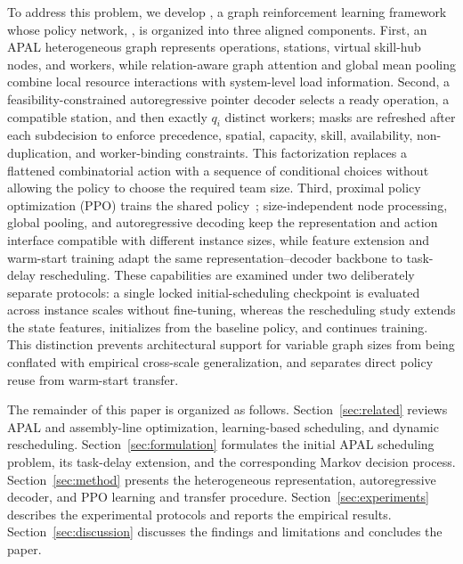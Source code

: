 To address this problem, we develop \method{}, a graph reinforcement learning framework whose policy network, \network{}, is organized into three aligned components. First, an APAL heterogeneous graph represents operations, stations, virtual skill-hub nodes, and workers, while relation-aware graph attention and global mean pooling combine local resource interactions with system-level load information. Second, a feasibility-constrained autoregressive pointer decoder selects a ready operation, a compatible station, and then exactly $q_i$ distinct workers; masks are refreshed after each subdecision to enforce precedence, spatial, capacity, skill, availability, non-duplication, and worker-binding constraints. This factorization replaces a flattened combinatorial action with a sequence of conditional choices without allowing the policy to choose the required team size. Third, proximal policy optimization (PPO) trains the shared policy~\cite{schulman2017}; size-independent node processing, global pooling, and autoregressive decoding keep the representation and action interface compatible with different instance sizes, while feature extension and warm-start training adapt the same representation--decoder backbone to task-delay rescheduling. These capabilities are examined under two deliberately separate protocols: a single locked initial-scheduling checkpoint is evaluated across instance scales without fine-tuning, whereas the rescheduling study extends the state features, initializes from the baseline policy, and continues training. This distinction prevents architectural support for variable graph sizes from being conflated with empirical cross-scale generalization, and separates direct policy reuse from warm-start transfer.

The remainder of this paper is organized as follows. Section~\ref{sec:related} reviews APAL and assembly-line optimization, learning-based scheduling, and dynamic rescheduling. Section~\ref{sec:formulation} formulates the initial APAL scheduling problem, its task-delay extension, and the corresponding Markov decision process. Section~\ref{sec:method} presents the heterogeneous representation, autoregressive decoder, and PPO learning and transfer procedure. Section~\ref{sec:experiments} describes the experimental protocols and reports the empirical results. Section~\ref{sec:discussion} discusses the findings and limitations and concludes the paper.

